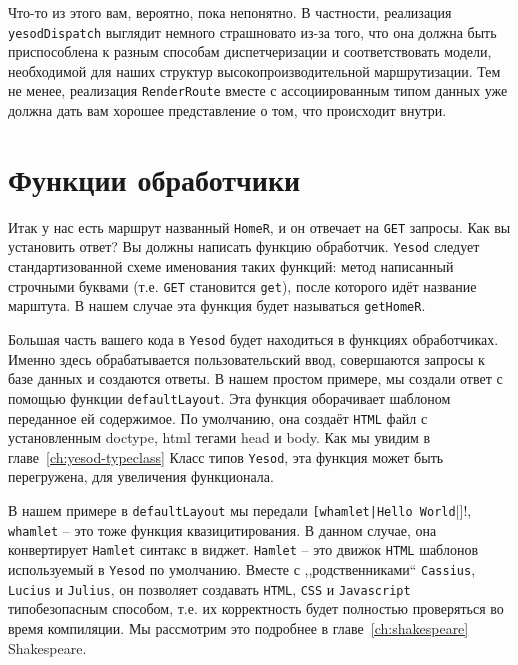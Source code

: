 Что-то из этого вам, вероятно, пока непонятно. В частности, реализация
\lstinline!yesodDispatch! выглядит немного страшновато из-за того, что она должна быть
приспособлена к разным способам диспетчеризации и соответствовать модели, необходимой для
наших структур высокопроизводительной маршрутизации. Тем не менее, реализация
\lstinline!RenderRoute! вместе с ассоциированным типом данных уже должна дать вам хорошее
представление о том, что происходит внутри.

\section{Функции обработчики}

Итак у нас есть маршрут названный \lstinline!HomeR!, и он отвечает на \texttt{GET} запросы. 
Как вы установить ответ? Вы должны написать функцию обработчик. \texttt{Yesod} следует
стандартизованной схеме именования таких функций: 
метод написанный строчными буквами (т.е. \texttt{GET} становится \lstinline!get!), после которого идёт 
название марштута. В нашем случае эта функция будет называться \lstinline!getHomeR!.

Большая часть вашего кода в \texttt{Yesod} будет находиться в функциях обработчиках. 
Именно здесь обрабатывается пользовательский ввод, совершаются запросы к базе данных и создаются ответы. 
В нашем простом примере, мы создали ответ с помощью функции \lstinline!defaultLayout!. 
Эта функция оборачивает шаблоном переданное ей содержимое.  По умолчанию, 
она создаёт \texttt{HTML} файл с установленным doctype, html тегами head и body. 
Как мы увидим в главе~\ref{ch:yesod-typeclass} Класс типов \texttt{Yesod}, 
эта функция может быть перегружена, для увеличения функционала.

В нашем примере в \lstinline!defaultLayout! мы передали 
\lstinline![whamlet|Hello World!|]!, \lstinline!whamlet! -- это тоже 
функция квазицитирования. В данном случае, она конвертирует 
\texttt{Hamlet} синтакс в виджет. \texttt{Hamlet} -- это движок 
\texttt{HTML} шаблонов используемый в \texttt{Yesod} по умолчанию. 
Вместе с ,,родственниками`` \texttt{Cassius}, \texttt{Lucius} 
и \texttt{Julius}, он позволяет создавать \texttt{HTML}, \texttt{CSS}
и \texttt{Javascript} типобезопасным способом, т.е. их корректность будет 
полностью проверяться во время компиляции. Мы рассмотрим это подробнее в 
главе~\ref{ch:shakespeare} Shakespeare.

